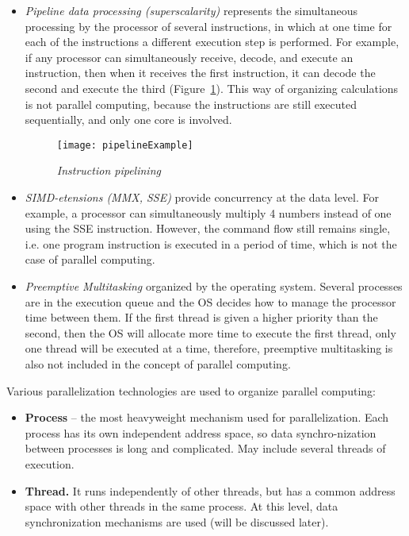 {		\begin{itemize}
			\item\textit{Pipeline data processing (superscalarity)} represents the simultaneous processing by the processor of several instructions, in which at one time for each of the instructions a different execution step is performed. For example, if any processor can simultaneously receive, decode, and execute an instruction, then when it receives the first instruction, it can decode the second and execute the third (Figure~\ref {pipelineExample:image}). This way of organizing calculations is not parallel computing, because the instructions are still executed sequentially, and only one core is involved.
				\begin{figure}[H]
					\texttt{[image: pipelineExample]}
					\caption{\textit{Instruction pipelining}}
					\label{pipelineExample:image}
				\end{figure}
			\item\textit{SIMD-etensions (MMX, SSE)} provide concurrency at the data level. For example, a processor can simultaneously multiply 4 numbers instead of one using the SSE instruction. However, the command flow still remains single, i.e. one program instruction is executed in a period of time, which is not the case of parallel computing.
			\item\textit{Preemptive Multitasking} organized by the operating system. Several processes are in the execution queue and the OS decides how to manage the processor time between them. If the first thread is given a higher priority than the second, then the OS will allocate more time to execute the first thread, only one thread will be executed at a time, therefore, preemptive multitasking is also not included in the concept of parallel computing.
		\end{itemize}
	\par Various parallelization technologies are used to organize parallel computing:
		\begin{itemize}
			\item\textbf{Process} -- the most heavyweight mechanism used for parallelization. Each process has its own independent address space, so data synchro-nization between processes is long and complicated. May include several threads of execution.
			\item\textbf{Thread.} It runs independently of other threads, but has a common address space with other threads in the same process. At this level, data synchronization mechanisms are used (will be discussed later).

\end{itemize}}
